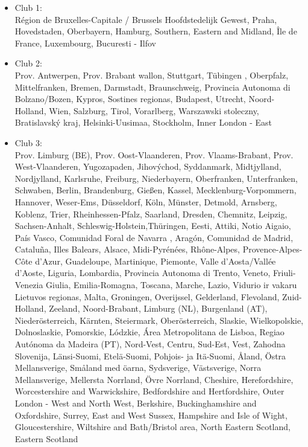 \documentclass[11pt]{article}
\begin{document}
\begin{itemize}
\item Club 1:\\
Région de Bruxelles-Capitale / Brussels Hoofdstedelijk Gewest, Praha, Hovedstaden, Oberbayern, Hamburg, Southern, Eastern and Midland, Île de France, Luxembourg, Bucuresti - Ilfov
\item Club 2:\\
Prov. Antwerpen, Prov. Brabant wallon, Stuttgart, Tübingen   , Oberpfalz, Mittelfranken, Bremen, Darmstadt, Braunschweig, Provincia Autonoma di Bolzano/Bozen, Kypros, Sostines regionas, Budapest, Utrecht, Noord-Holland, Wien, Salzburg, Tirol, Vorarlberg, Warszawski stoleczny, Bratislavský kraj, Helsinki-Uusimaa, Stockholm, Inner London - East
\item Club 3:\\
Prov. Limburg (BE), Prov. Oost-Vlaanderen, Prov. Vlaams-Brabant, Prov. West-Vlaanderen, Yugozapaden, Jihovýchod, Syddanmark, Midtjylland, Nordjylland, Karlsruhe, Freiburg, Niederbayern, Oberfranken, Unterfranken, Schwaben, Berlin, Brandenburg, Gießen, Kassel, Mecklenburg-Vorpommern, Hannover, Weser-Ems, Düsseldorf, Köln, Münster, Detmold, Arnsberg, Koblenz, Trier, Rheinhessen-Pfalz, Saarland, Dresden, Chemnitz, Leipzig, Sachsen-Anhalt, Schleswig-Holstein,Thüringen, Eesti, Attiki, Notio Aigaio, País Vasco, Comunidad Foral de Navarra
, Aragón, Comunidad de Madrid, Cataluña, Illes Balears, Alsace,  Midi-Pyrénées, Rhône-Alpes, Provence-Alpes-Côte d'Azur, Guadeloupe, Martinique, Piemonte, Valle d'Aosta/Vallée d'Aoste, Liguria, Lombardia, Provincia Autonoma di Trento, Veneto, Friuli-Venezia Giulia, Emilia-Romagna, Toscana, Marche, Lazio, Vidurio ir vakaru Lietuvos regionas, Malta, Groningen, Overijssel, Gelderland, Flevoland, Zuid-Holland, Zeeland, Noord-Brabant, Limburg (NL), Burgenland (AT), Niederösterreich, Kärnten, Steiermark, Oberösterreich, Slaskie, Wielkopolskie, Dolnoslaskie, Pomorskie, Lódzkie, Área Metropolitana de Lisboa, Regiao Autónoma da Madeira (PT), Nord-Vest, Centru, Sud-Est, Vest, Zahodna Slovenija, Länsi-Suomi, Etelä-Suomi, 	
Pohjois- ja Itä-Suomi, Åland, Östra Mellansverige, Småland med öarna, Sydsverige, Västsverige, Norra Mellansverige, Mellersta Norrland, Övre Norrland, Cheshire, Herefordshire, Worcestershire and Warwickshire, Bedfordshire and Hertfordshire, Outer London - West and North West, Berkshire, Buckinghamshire and Oxfordshire, Surrey, East and West Sussex, Hampshire and Isle of Wight, Gloucestershire, Wiltshire and Bath/Bristol area, North Eastern Scotland, Eastern Scotland



\end{itemize}
\end{document}
